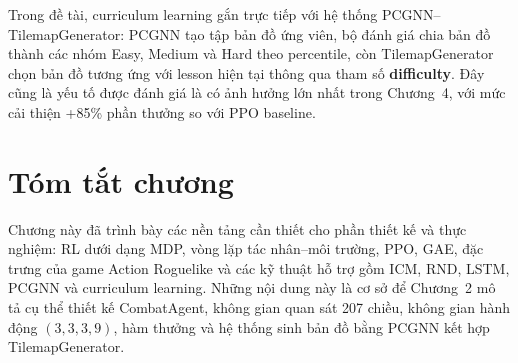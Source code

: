 Trong đề tài, curriculum learning gắn trực tiếp với hệ thống PCGNN--TilemapGenerator: PCGNN tạo tập bản đồ ứng viên, bộ đánh giá chia bản đồ thành các nhóm Easy, Medium và Hard theo percentile, còn TilemapGenerator chọn bản đồ tương ứng với lesson hiện tại thông qua tham số \textbf{difficulty}. Đây cũng là yếu tố được đánh giá là có ảnh hưởng lớn nhất trong Chương~4, với mức cải thiện +85\% phần thưởng so với PPO baseline.

\section{Tóm tắt chương}

Chương này đã trình bày các nền tảng cần thiết cho phần thiết kế và thực nghiệm: RL dưới dạng MDP, vòng lặp tác nhân--môi trường, PPO, GAE, đặc trưng của game Action Roguelike và các kỹ thuật hỗ trợ gồm ICM, RND, LSTM, PCGNN và curriculum learning. Những nội dung này là cơ sở để Chương~2 mô tả cụ thể thiết kế CombatAgent, không gian quan sát 207 chiều, không gian hành động $(3,3,3,9)$, hàm thưởng và hệ thống sinh bản đồ bằng PCGNN kết hợp TilemapGenerator.
